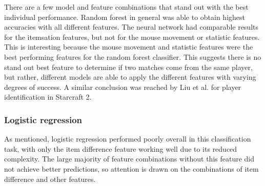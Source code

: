 \documentclass[Report.tex]{subfiles}
\begin{document}

There are a few model and feature combinations that stand out with the best individual performance. Random forest in general was able to obtain highest accuracies with all different features. The neural network had comparable results for the itemsation features, but not for the mouse movement or statistic features. This is interesting because the mouse movement and statistic features were the best performing features for the random forest classifier. This suggests there is no stand out best feature to determine if two matches come from the same player, but rather, different models are able to apply the different features with varying degrees of success. A similar conclusion was reached by Liu et al. \cite{starcraft-identification} for player identification in Starcraft 2. 

\subsubsection{Logistic regression}
As mentioned, logistic regression performed poorly overall in this classification task, with only the item difference feature working well due to its reduced complexity. The large majority of feature combinations without this feature did not achieve better predictions, so attention is drawn on the combinations of item difference and other features. 
\end{document}
